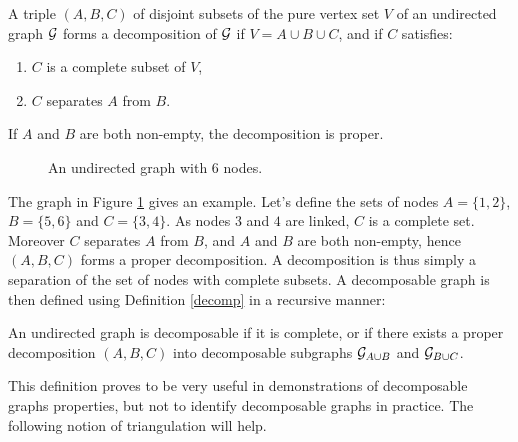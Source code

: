  \begin{definition}\label{decomp}
 A triple $(A, B, C)$ of disjoint subsets of the pure vertex set $V$ of an undirected graph $\mathcal{G}$ forms a decomposition of $\mathcal{G}$ if $V=A\cup B \cup C$, and if $C$ satisfies:
 \begin{enumerate}[label=(\roman*)]
 \item $C$ is a complete subset of  $V$,
 \item $C$ separates $A$ from $B$.
 \end{enumerate}
 If $A$ and $B$ are both non-empty, the decomposition is proper.
 \end{definition}
 \begin{figure}[H]
 \begin{center}
 \caption{An undirected graph with 6 nodes.}
  \label{ex:graph0}
    \end{center}
\end{figure}
The graph in Figure \ref{ex:graph0} gives an example. Let's define the sets of nodes $A=\{1,2\}$, $B=\{5,6\}$ and $C=\{3,4\}$. As nodes $3$ and $4$ are linked, $C$ is a complete set. Moreover $C$ separates $A$ from $B$, and $A$ and $B$ are both non-empty, hence $(A, B, C)$  forms a proper decomposition. A decomposition is thus simply a separation of the set of nodes with complete subsets. A decomposable graph is then defined using Definition \ref{decomp} in a recursive manner:
 \begin{definition}
 An undirected graph is decomposable if it is complete, or if there exists a proper decomposition $(A, B, C)$ into decomposable subgraphs $\mathcal{G}_{A\cup B}$ and $\mathcal{G}_{B\cup C}$.
 \end{definition}
 This definition proves to be very useful in demonstrations of decomposable graphs properties, but not to identify decomposable graphs in practice. The following notion of triangulation will help.
 
